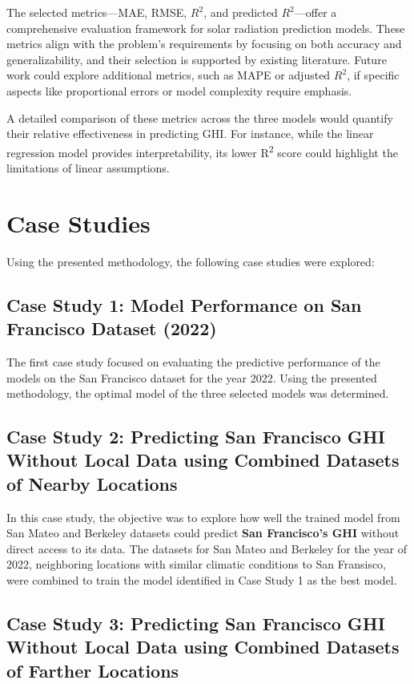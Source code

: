 \documentclass[10pt,twocolumn]{article}
\begin{document}
\begin{itemize}
The selected metrics—MAE, RMSE, \( R^2 \), and predicted \( R^2 \)—offer a comprehensive evaluation framework for solar radiation prediction models. These metrics align with the problem's requirements by focusing on both accuracy and generalizability, and their selection is supported by existing literature. Future work could explore additional metrics, such as MAPE or adjusted \( R^2 \), if specific aspects like proportional errors or model complexity require emphasis.


A detailed comparison of these metrics across the three models would quantify their relative effectiveness in predicting GHI. For instance, while the linear regression model provides interpretability, its lower R\textsuperscript{2} score could highlight the limitations of linear assumptions.
\section{Case Studies}

Using the presented methodology, the following case studies were explored:

\subsection{Case Study 1: Model Performance on San Francisco Dataset (2022)}
The first case study focused on evaluating the predictive performance of the models on the {San Francisco dataset for the year 2022}. Using the presented methodology, the optimal model of the three selected models was determined. 

\subsection{Case Study 2: Predicting San Francisco GHI Without Local Data using Combined Datasets of Nearby Locations}

In this case study, the objective was to explore how well the trained model from {San Mateo and Berkeley datasets} could predict \textbf{San Francisco's GHI} without direct access to its data. The datasets for San Mateo and Berkeley for the year of 2022, neighboring locations with similar climatic conditions to San Fransisco, were combined to train the model identified in Case Study 1 as the best model. 


\subsection{Case Study 3: Predicting San Francisco GHI Without Local Data using Combined Datasets of Farther Locations}


\end{itemize}
\end{document}
